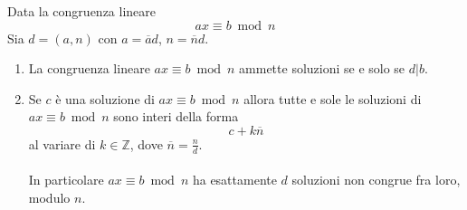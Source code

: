 \documentclass[a4paper,12pt, oneside]{book}
\begin{document}
\begin{teorema}
	Data la congruenza lineare $$ax \equiv b \bmod n$$
	Sia $d = (a,n)$ con $a = \overline{a}d$, $n = \overline{n}d$.
	\begin{enumerate}
		\item La congruenza lineare $ax \equiv b \bmod n$ ammette soluzioni se e solo se $d|b$.
		\item Se $c$ è una soluzione di $ax \equiv b \bmod n$ allora tutte e sole le soluzioni di $ax \equiv b \bmod n$ sono interi della forma $$c + k\overline{n}$$ al variare di $k \in \mathbb{Z}$, dove $\overline{n} = \frac{n}{d}$.\\\\
		      In particolare $ax \equiv b \bmod n$ ha esattamente $d$ soluzioni non congrue fra loro, modulo $n$.
	\end{enumerate}


\end{teorema}
\end{document}
